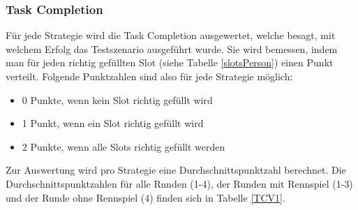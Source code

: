 \documentclass[12pt,a4paper]{scrartcl}
\begin{document}

\subsubsection{Task Completion}
\label{tcausw1}
Für jede Strategie wird die Task Completion ausgewertet, welche besagt, mit welchem Erfolg das Testszenario ausgeführt wurde. Sie wird bemessen, indem man für jeden richtig gefüllten Slot (siehe Tabelle \ref{slotsPerson}) einen Punkt verteilt. Folgende Punktzahlen sind also für jede Strategie möglich:
\begin{itemize}
\item 0 Punkte, wenn kein Slot richtig gefüllt wird
\item 1 Punkt, wenn ein Slot richtig gefüllt wird
\item 2 Punkte, wenn alle Slots richtig gefüllt werden
\end{itemize}
Zur Auswertung wird pro Strategie eine Durchschnittspunktzahl berechnet. Die Durchschnittspunktzahlen für alle Runden (1-4), der Runden mit Rennspiel (1-3) und der Runde ohne Rennspiel (4) finden sich in Tabelle \ref{TCV1}.
\newpage
\end{document}
